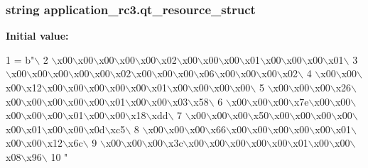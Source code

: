 \subsubsection[{qt\+\_\+resource\+\_\+struct}]{\setlength{\rightskip}{0pt plus 5cm}string application\+\_\+rc3.\+qt\+\_\+resource\+\_\+struct}\label{namespaceapplication__rc3_aca1bd0cd6fb65a450b2db291a3868222}
{\bfseries Initial value\+:}
\begin{DoxyCode}
1 = b\textcolor{stringliteral}{"\(\backslash\)}
2 \textcolor{stringliteral}{\(\backslash\)x00\(\backslash\)x00\(\backslash\)x00\(\backslash\)x00\(\backslash\)x00\(\backslash\)x02\(\backslash\)x00\(\backslash\)x00\(\backslash\)x00\(\backslash\)x01\(\backslash\)x00\(\backslash\)x00\(\backslash\)x00\(\backslash\)x01\(\backslash\)}
3 \textcolor{stringliteral}{\(\backslash\)x00\(\backslash\)x00\(\backslash\)x00\(\backslash\)x00\(\backslash\)x00\(\backslash\)x02\(\backslash\)x00\(\backslash\)x00\(\backslash\)x00\(\backslash\)x06\(\backslash\)x00\(\backslash\)x00\(\backslash\)x00\(\backslash\)x02\(\backslash\)}
4 \textcolor{stringliteral}{\(\backslash\)x00\(\backslash\)x00\(\backslash\)x00\(\backslash\)x12\(\backslash\)x00\(\backslash\)x00\(\backslash\)x00\(\backslash\)x00\(\backslash\)x00\(\backslash\)x01\(\backslash\)x00\(\backslash\)x00\(\backslash\)x00\(\backslash\)x00\(\backslash\)}
5 \textcolor{stringliteral}{\(\backslash\)x00\(\backslash\)x00\(\backslash\)x00\(\backslash\)x26\(\backslash\)x00\(\backslash\)x00\(\backslash\)x00\(\backslash\)x00\(\backslash\)x00\(\backslash\)x01\(\backslash\)x00\(\backslash\)x00\(\backslash\)x03\(\backslash\)x58\(\backslash\)}
6 \textcolor{stringliteral}{\(\backslash\)x00\(\backslash\)x00\(\backslash\)x00\(\backslash\)x7e\(\backslash\)x00\(\backslash\)x00\(\backslash\)x00\(\backslash\)x00\(\backslash\)x00\(\backslash\)x01\(\backslash\)x00\(\backslash\)x00\(\backslash\)x18\(\backslash\)xdd\(\backslash\)}
7 \textcolor{stringliteral}{\(\backslash\)x00\(\backslash\)x00\(\backslash\)x00\(\backslash\)x50\(\backslash\)x00\(\backslash\)x00\(\backslash\)x00\(\backslash\)x00\(\backslash\)x00\(\backslash\)x01\(\backslash\)x00\(\backslash\)x00\(\backslash\)x0d\(\backslash\)xc5\(\backslash\)}
8 \textcolor{stringliteral}{\(\backslash\)x00\(\backslash\)x00\(\backslash\)x00\(\backslash\)x66\(\backslash\)x00\(\backslash\)x00\(\backslash\)x00\(\backslash\)x00\(\backslash\)x00\(\backslash\)x01\(\backslash\)x00\(\backslash\)x00\(\backslash\)x12\(\backslash\)x6c\(\backslash\)}
9 \textcolor{stringliteral}{\(\backslash\)x00\(\backslash\)x00\(\backslash\)x00\(\backslash\)x3c\(\backslash\)x00\(\backslash\)x00\(\backslash\)x00\(\backslash\)x00\(\backslash\)x00\(\backslash\)x01\(\backslash\)x00\(\backslash\)x00\(\backslash\)x08\(\backslash\)x96\(\backslash\)}
10 \textcolor{stringliteral}{"}
\end{DoxyCode}
